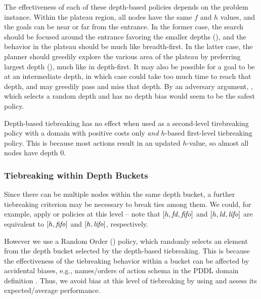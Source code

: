 The effectiveness of each of these depth-based policies depends on the
problem instance.  Within
the plateau region, all nodes have the same $f$ and $h$ values, 
and the goals can be near or far
from the entrance.  In the former case, the
search should be focused around the entrance favoring the smaller depths
(\fd), and the behavior in the plateau should be much like breadth-first. In the
latter case, the planner should greedily explore the various area of the
plateau by preferring largest depth (\ld), much like in
depth-first. 
It may also be possible for a goal to be at an intermediate depth, in which case
\fd could take too much time to reach that
depth, and \ld may greedily pass and miss that depth.
By an adversary argument, \rd, which selects a random depth and has no depth bias would seem to be the safest policy.

Depth-based tiebreaking has no effect when used as a second-level tirebreaking policy with a domain with positive costs only \emph{and} $h$-based first-level tiebreaking policy. This is because most actions result in an updated $h$-value, so almost all nodes have depth 0.

\subsubsection{Tiebreaking within Depth Buckets}
Since there can be multiple nodes within the same depth bucket,
a further tiebreaking criterion may be necessary to break ties among them.
We could, for example, apply \lifo or \fifo policies at this level -- 
note that $[h,{\mbox{\textit{fd}}},{\mbox{\textit{fifo}}}]$ and $[h,{\mbox{\textit{ld}}},{\mbox{\textit{lifo}}}]$ are equivalent to $[h,{\mbox{\textit{fifo}}}]$ and $[h,{\mbox{\textit{lifo}}}]$, respectively.

However we use a Random Order (\ro) policy, which 
randomly selects an element from the depth bucket selected by the depth-based tiebreaking.
This is because the effectiveness of the tiebreaking behavior within a bucket
can be affected by accidental biases, e.g., names/orders of action schema in the PDDL domain
definition \cite{vallati2015effective}.
Thus, we avoid bias at this level of tiebreaking by using \ro and assess its expected/average
performance.



